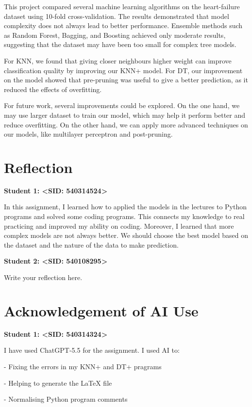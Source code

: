 \documentclass[12pt,a4paper]{article}
\begin{document}
This project compared several machine learning algorithms on the heart-failure dataset using 10-fold cross-validation. The results demonstrated that model complexity does not always lead to better performance. Ensemble methods such as Random Forest, Bagging, and Boosting achieved only moderate results, suggesting that the dataset may have been too small for complex tree models.

For KNN, we found that giving closer neighbours higher weight can improve classification quality by improving our KNN+ model. For DT, our improvement on the model showed that pre-pruning was useful to give a better prediction, as it reduced the effects of overfitting.

For future work, several improvements could be explored. On the one hand, we may use larger dataset to train our model, which may help it perform better and reduce overfitting. On the other hand, we can apply more advanced techniques on our models, like multilayer perceptron and post-pruning.

\section{Reflection}

\textbf{Student 1: \textless SID: 540314524\textgreater}

In this assignment, I learned how to applied the models in the lectures to Python programs and solved some coding programs. This connects my knowledge to real practicing and improved my ability on coding. Moreover, I learned that more complex models are not always better. We should choose the best model based on the dataset and the nature of the data to make prediction.

\textbf{Student 2: \textless SID: 540108295\textgreater}

Write your reflection here.

\section{Acknowledgement of AI Use}

\textbf{Student 1: \textless SID: 540314324\textgreater}

I have used ChatGPT-5.5 for the assignment. I used AI to:

- Fixing the errors in my KNN+ and DT+ pragrams

- Helping to generate the LaTeX file

- Normalising Python program comments
\end{document}
